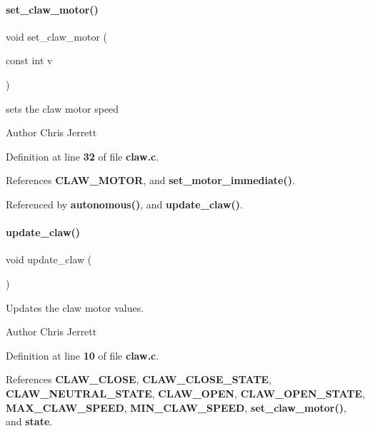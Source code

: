 \paragraph{set\+\_\+claw\+\_\+motor()}
{\footnotesize\ttfamily void set\+\_\+claw\+\_\+motor (\begin{DoxyParamCaption}\item[{const int}]{v }\end{DoxyParamCaption})}



sets the claw motor speed 

\begin{DoxyAuthor}{Author}
Chris Jerrett 
\end{DoxyAuthor}


Definition at line \textbf{ 32} of file \textbf{ claw.\+c}.



References \textbf{ C\+L\+A\+W\+\_\+\+M\+O\+T\+OR}, and \textbf{ set\+\_\+motor\+\_\+immediate()}.



Referenced by \textbf{ autonomous()}, and \textbf{ update\+\_\+claw()}.

\mbox{\label{claw_8c_a0122b78972344264b8a276a559cfce4a}} 
\paragraph{update\+\_\+claw()}
{\footnotesize\ttfamily void update\+\_\+claw (\begin{DoxyParamCaption}{ }\end{DoxyParamCaption})}



Updates the claw motor values. 

\begin{DoxyAuthor}{Author}
Chris Jerrett 
\end{DoxyAuthor}


Definition at line \textbf{ 10} of file \textbf{ claw.\+c}.



References \textbf{ C\+L\+A\+W\+\_\+\+C\+L\+O\+SE}, \textbf{ C\+L\+A\+W\+\_\+\+C\+L\+O\+S\+E\+\_\+\+S\+T\+A\+TE}, \textbf{ C\+L\+A\+W\+\_\+\+N\+E\+U\+T\+R\+A\+L\+\_\+\+S\+T\+A\+TE}, \textbf{ C\+L\+A\+W\+\_\+\+O\+P\+EN}, \textbf{ C\+L\+A\+W\+\_\+\+O\+P\+E\+N\+\_\+\+S\+T\+A\+TE}, \textbf{ M\+A\+X\+\_\+\+C\+L\+A\+W\+\_\+\+S\+P\+E\+ED}, \textbf{ M\+I\+N\+\_\+\+C\+L\+A\+W\+\_\+\+S\+P\+E\+ED}, \textbf{ set\+\_\+claw\+\_\+motor()}, and \textbf{ state}.



